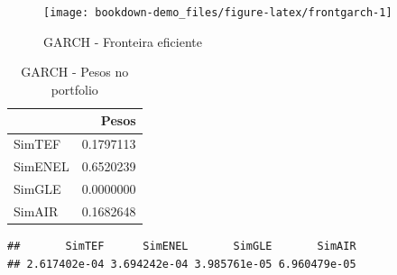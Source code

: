 \documentclass[
  12pt,
  a4paper,
  openany]{book}
\newenvironment{Shaded}{\begin{snugshade}}{\end{snugshade}}
\newcommand{\DataTypeTok}[1]{\textcolor[rgb]{0.13,0.29,0.53}{#1}}
\newcommand{\DecValTok}[1]{\textcolor[rgb]{0.00,0.00,0.81}{#1}}
\newcommand{\FloatTok}[1]{\textcolor[rgb]{0.00,0.00,0.81}{#1}}
\newcommand{\KeywordTok}[1]{\textcolor[rgb]{0.13,0.29,0.53}{\textbf{#1}}}
\newcommand{\NormalTok}[1]{#1}
\newcommand{\OperatorTok}[1]{\textcolor[rgb]{0.81,0.36,0.00}{\textbf{#1}}}
\newcommand{\StringTok}[1]{\textcolor[rgb]{0.31,0.60,0.02}{#1}}
\begin{document}
\normalsize

\begin{figure}

{\centering \texttt{[image: bookdown-demo\_files/figure-latex/frontgarch-1]} 

}

\caption{GARCH - Fronteira eficiente}\label{fig:frontgarch}
\end{figure}

\begin{table}[!h]

\caption{\label{tab:unnamed-chunk-44}GARCH - Pesos no portfolio}
\centering
\begin{tabular}[t]{lr}
\toprule
  & Pesos\\
\midrule
SimTEF & 0.1797113\\
SimENEL & 0.6520239\\
SimGLE & 0.0000000\\
SimAIR & 0.1682648\\
\bottomrule
\end{tabular}
\end{table}

\scriptsize

\begin{Shaded}
\end{Shaded}

\begin{verbatim}
##       SimTEF      SimENEL       SimGLE       SimAIR 
## 2.617402e-04 3.694242e-04 3.985761e-05 6.960479e-05
\end{verbatim}

\begin{Shaded}
\end{Shaded}
\end{document}
